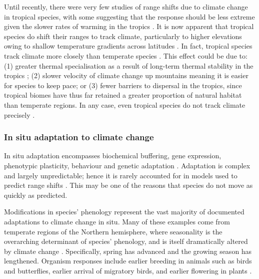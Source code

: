 \documentclass[12pt,a4paper,]{report}
\theoremstyle{definition}
\theoremstyle{definition}
\theoremstyle{definition}
\theoremstyle{remark}
\begin{document}
Until recently, there were very few studies of range shifts due to
climate change in tropical species, with some suggesting that the
response should be less extreme given the slower rates of warming in the
tropics \citep{freeman_rapid2014, stocker_climate2013}. It is now
apparent that tropical species do shift their ranges to track climate,
particularly to higher elevations
\citep{chen_elevation2009, pounds_biological1999} owing to shallow
temperature gradients across latitudes \citep{colwell_global2008}. In
fact, tropical species track climate more closely than temperate species
\citep{freeman_rapid2014}. This effect could be due to: (1) greater
thermal specialisation as a result of long-term thermal stability in the
tropics \citep{freeman_rapid2014}; (2) slower velocity of climate change
up mountains \citep{loarie_velocity2009} meaning it is easier for
species to keep pace; or (3) fewer barriers to dispersal in the tropics,
since tropical biomes have thus far retained a greater proportion of
natural habitat than temperate regions. In any case, even tropical
species do not track climate precisely \citep{chen_elevation2009}.

\subsubsection{In situ adaptation to climate
change}\label{in-situ-adaptation-to-climate-change}

In situ adaptation encompasses biochemical buffering, gene expression,
phenotypic plasticity, behaviour and genetic adaptation
\citep{peck_organisms2011}. Adaptation is complex and largely
unpredictable; hence it is rarely accounted for in models used to
predict range shifts \citep{peck_organisms2011}. This may be one of the
reasons that species do not move as quickly as predicted.

Modifications in species' phenology represent the vast majority of
documented adaptations to climate change in situ. Many of these examples
come from temperate regions of the Northern hemisphere, where
seasonality is the overarching determinant of species' phenology, and is
itself dramatically altered by climate change
\citep{bradshaw_evolutionary2006}. Specifically, spring has advanced and
the growing season has lengthened. Organism responses include earlier
breeding in animals such as birds and butterflies, earlier arrival of
migratory birds, and earlier flowering in plants
\citep{walther_ecological2002}.
\end{document}
